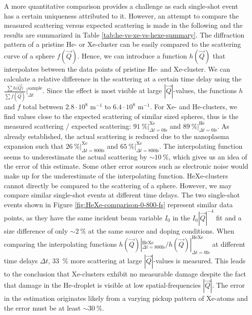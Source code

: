 A more quantitative comparison provides a challenge as each single-shot event has a certain uniqueness attributed to it. However, an attempt to compare the measured scattering versus expected scattering is made in the following and the results are summarized in Table \ref{tab:he-vs-xe-vs-hexe-summary}. The diffraction pattern of a pristine He- or Xe-cluster can be easily compared to the scattering curve of a sphere $f(\vec{Q})$. Hence, we can introduce a function $h(\vec{Q})$ that interpolates between the data points of pristine He- and Xe-cluster. We can calculate a relative difference in the scattering at a certain time delay using the $\tfrac{\sum{h(\vec{Q}})}{\sum{f(\vec{Q})}}|_{\Delta t}^{\text{sample}}$. Since the effect is most visible at large $\left|\vec{Q}\right|$-values, the functions $h$ and $f$ total between $2.8\cdot 10^{8}$ m$^{-1}$ to $6.4\cdot 10^{8}$ m$^{-1}$. For Xe- and He-clusters, we find values close to the expected scattering of similar sized spheres, thus is the measured scattering / expected scattering: $\SI{91}{\percent} |_{\Delta t = 0 \text{fs}}^{\text{Xe}}$ and $\SI{89}{\percent}|_{\Delta t=0 \text{fs}}^{\text{He}}$. As already established, the actual scattering is reduced due to the nanoplasma expansion such that $\SI{26}{\percent} |_{\Delta t = 800 \text{fs}}^{\text{Xe}}$ and $\SI{65}{\percent} |_{\Delta t = 800 \text{fs}}^{\text{Xe}}$. The interpolating function seems to underestimate the actual scattering by $\sim \SI{10}{\percent}$, which gives us an idea of the error of this estimate. Some other error sources such as electronic noise would make up for the underestimate of the interpolating function. HeXe-clusters cannot directly be compared to the scattering of a sphere. However, we may compare similar single-shot events at different time delays. The two single-shot events shown in Figure \ref{fig:HeXe-comparison-0-800-fs} represent similar data points, as they have the same incident beam variable $I_{0}$ in the $I_{0} \left|\vec{Q}\right|^{-4}$ fit and a size difference of only $\sim \SI{2}{\percent}$ at the same source and doping conditions. When comparing the interpolating functions $h(\vec{Q}) |_{\Delta t = 800 \text{fs}}^{\text{HeXe}}/h(\vec{Q}) |_{\Delta t = 0 \text{fs}}^{\text{HeXe}}$ at different time delays $\Delta t$, \SI{33}{\percent} more scattering at large $\left|\vec{Q}\right|$-values is measured. This leads to the conclusion that Xe-clusters exhibit no measurable damage despite the fact that damage in the He-droplet is visible at low spatial-frequencies $\left|\vec{Q}\right|$. The error in the estimation originates likely from a varying pickup pattern of Xe-atoms and the error must be at least $\sim \SI{30}{\percent}$.\\[1\baselineskip]
